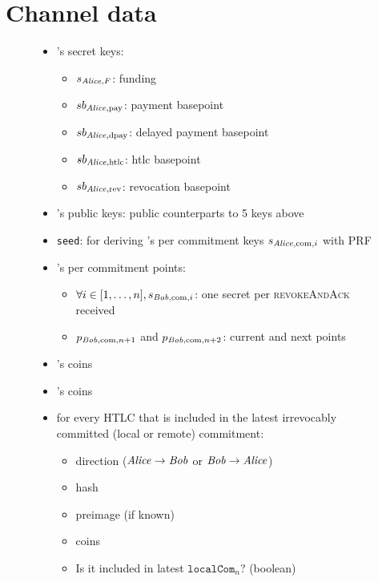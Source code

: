 \section{Channel data}
  \begin{figure}
  \begin{mdframed}
    \begin{itemize}
      \item \alice's secret keys:
      \begin{itemize}
        \item $s_{\mathit{Alice}, F}$: funding
        \item $sb_{\mathit{Alice}, \mathrm{pay}}$: payment basepoint
        \item $sb_{\mathit{Alice}, \mathrm{dpay}}$: delayed payment basepoint
        \item $sb_{\mathit{Alice}, \mathrm{htlc}}$: htlc basepoint
        \item $sb_{\mathit{Alice}, \mathrm{rev}}$: revocation basepoint
      \end{itemize}
      \item \bob's public keys: public counterparts to 5 keys above
      \item \texttt{seed}: for deriving \alice's per commitment keys $s_{\mathit{Alice},
      \mathrm{com}, i}$ with PRF
      \item \bob's per commitment points:
      \begin{itemize}
        \item $\forall i \in [1, \dots, n], s_{\mathit{Bob}, \mathrm{com}, i}$: one
        secret per \textsc{revokeAndAck} received
        \item $p_{\mathit{Bob}, \mathrm{com}, n+1}$ and $p_{\mathit{Bob}, \mathrm{com}, n+2}$:
        current and next points
      \end{itemize}
      \item \alice's coins
      \item \bob's coins
      \item for every HTLC that is included in the latest irrevocably committed
      (local or remote) commitment:
        \begin{itemize}
          \item direction ($\mathit{Alice} \rightarrow \mathit{Bob}$ or $\mathit{Bob} \rightarrow \mathit{Alice}$)
          \item hash
          \item preimage (if known)
          \item coins
          \item Is it included in latest $\mathtt{localCom}_n$? (boolean)

\end{itemize}
\end{itemize}
\end{mdframed}
\end{figure}
